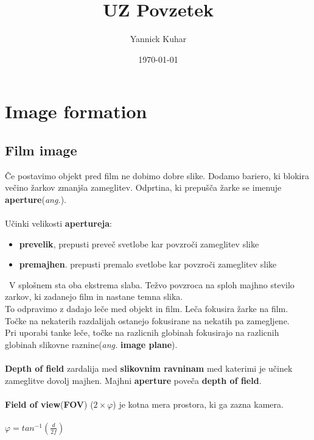 \documentclass[11pt]{article}
\title{UZ Povzetek}
\author{Yannick Kuhar}
\date{\today}
\begin{document}
\clearpage
\maketitle
\thispagestyle{empty}

\newpage

\section{Image formation}

\subsection{Film image}

\v{C}e postavimo objekt pred film ne dobimo dobre slike. Dodamo bariero, ki blokira ve\v{c}ino \v{z}arkov zmanj\v{s}a zameglitev. Odprtina, ki prepu\v{s}\v{c}a \v{z}arke se imenuje \textbf{aperture}(\textit{ang.}). \\
\\
U\v{c}inki velikosti \textbf{apertureja}:
\begin{itemize}
\item \textbf{prevelik}, prepusti preve\v{c} svetlobe kar povzro\v{c}i zameglitev slike
\item \textbf{premajhen}. prepusti premalo svetlobe kar povzro\v{c}i zameglitev slike
\end{itemize}
\
V splo\v{s}nem sta oba ekstrema slaba. Te\v{z}vo povzroca na sploh majhno stevilo zarkov, ki zadanejo film in nastane temna slika. \\
To odpravimo z dadajo le\v{c}e med objekt in film. Le\v{c}a fokusira \v{z}arke na film. To\v{c}ke na nekaterih razdalijah ostanejo fokusirane na nekatih pa zamegljene. \\
Pri uporabi tanke le\v{c}e, to\v{c}ke na razlicnih globinah fokusirajo na razlicnih globinah slikovne raznine(\textit{ang.} \textbf{image plane}). \\
\\
\textbf{Depth of field} zardalija med \textbf{slikovnim ravninam} med katerimi je u\v{c}inek zameglitve dovolj majhen. Majhni \textbf{aperture} pove\v{c}a \textbf{depth of field}. \\
\\
\textbf{Field of view}(\textbf{FOV}) ($2 \times \varphi$) je kotna mera prostora, ki ga zazna kamera. \\
\\
\indent $\varphi = tan^{-1}(\frac{d}{2f})$\\
\end{document}
